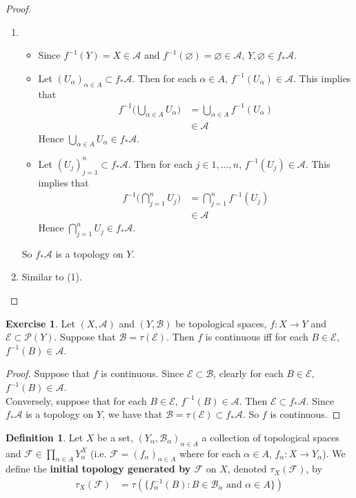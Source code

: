 \documentclass[12pt]{amsart}
\theoremstyle{definition}
\newtheorem{defn}[definition]{Definition}
\newtheorem{ex}[definition]{Exercise}
\newcommand{\al}{\alpha}
\newcommand{\MA}{\mathcal{A}}
\newcommand{\MB}{\mathcal{B}}
\newcommand{\MF}{\mathcal{F}}
\newcommand{\MP}{\mathcal{P}}
\newcommand{\ME}{\mathcal{E}}
\newcommand{\tbf}[1]{\textbf{#1}}
\DeclareMathOperator*{\0}{\mbf{0}}
\DeclareMathOperator*{\1}{\mbf{1}}
\newcommand{\lex}[1]{\label{ex:#1}}
\newcommand{\ld}[1]{\label{defn:#1}}
\begin{document}
	\begin{proof}\
		\begin{enumerate}
			\item 
			\begin{itemize}
			\item Since $f^{-1}(Y) = X \in \MA$ and $f^{-1}(\varnothing) = \varnothing \in \MA$, $Y, \varnothing \in f_*\MA$.
			\item Let $(U_{\al})_{\al \in A} \subset f_*\MA$. Then for each $\al \in A$, $f^{-1}(U_{\al}) \in \MA$. This implies that 
			\begin{align*}
			f^{-1}\bigg( \bigcup\limits_{\al \in A}U_{\al} \bigg) 
			&=  \bigcup\limits_{\al \in A} f^{-1}(U_{\al}) \\
			& \in \MA
			\end{align*}
			Hence $\bigcup\limits_{\al \in A}U_{\al} \in f_*\MA$.
			\item Let $(U_{j})_{j=1}^n \subset f_*\MA$. Then for each $j \in {1, \ldots, n}$, $f^{-1}(U_{j}) \in \MA$. This implies that 
			\begin{align*}
			f^{-1}\bigg( \bigcap\limits_{j=1}^n U_{j} \bigg) 
			&=  \bigcap\limits_{j=1}^n f^{-1}(U_{j}) \\
			& \in \MA
			\end{align*}
			Hence $\bigcap\limits_{j=1}^n U_{j} \in f_*\MA$.
			\end{itemize}
			So $f_*\MA$ is a topology on $Y$.
			\item Similar to (1).
		\end{enumerate}
	\end{proof}	
	
	\begin{ex} \lex{}
	Let $(X,\MA)$ and $(Y,\MB)$ be topological spaces, $f:X \rightarrow Y$ and $\ME \subset \MP(Y)$. Suppose that $\MB = \tau(\ME)$. Then $f$ is continuous iff for each $B \in \ME$, $f^{-1}(B) \in \MA$.
	\end{ex}
	
	\begin{proof}
	Suppose that $f$ is continuous. Since $\ME \subset \MB$, clearly for each $B \in \ME$, $f^{-1}(B) \in \MA$. \\
	Conversely, suppose that for each $B \in \ME$, $f^{-1}(B) \in \MA$. Then $\ME \subset f_*\MA$. Since $f_*\MA$ is a topology on $Y$, we have that $\MB = \tau(\ME) \subset f_*\MA$. So $f$ is continuous.
	\end{proof}
	
	\begin{defn} \ld{}
	Let $X$ be a set, $(Y_{\al}, \MB_{\al})_{\al \in A}$ a collection of topological spaces and $\MF \in \prod \limits_{\al \in A}Y_{\al}^X$ (i.e. $\MF = (f_{\al})_{\al \in A}$ where for each $\al \in A$, $f_{\al}:X \rightarrow Y_{\al}$). We define the \tbf{initial topology generated by $\MF$} on $X$, denoted $\tau_X(\MF)$, by 
	\begin{align*}
	\tau_X(\MF) 
	&= \tau(\{f_{\al}^{-1}(B): B \in \MB_{\al} \text{ and } \al \in A \})
\end{align*}	 
	\end{defn}
	
\end{document}
